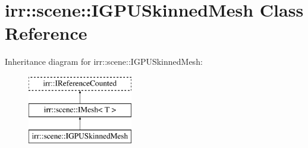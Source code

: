 \hypertarget{classirr_1_1scene_1_1IGPUSkinnedMesh}{}\section{irr\+:\+:scene\+:\+:I\+G\+P\+U\+Skinned\+Mesh Class Reference}
\label{classirr_1_1scene_1_1IGPUSkinnedMesh}
Inheritance diagram for irr\+:\+:scene\+:\+:I\+G\+P\+U\+Skinned\+Mesh\+:\begin{figure}[H]
\begin{center}
\leavevmode
\includegraphics[height=3.000000cm]{classirr_1_1scene_1_1IGPUSkinnedMesh}
\end{center}
\end{figure}
